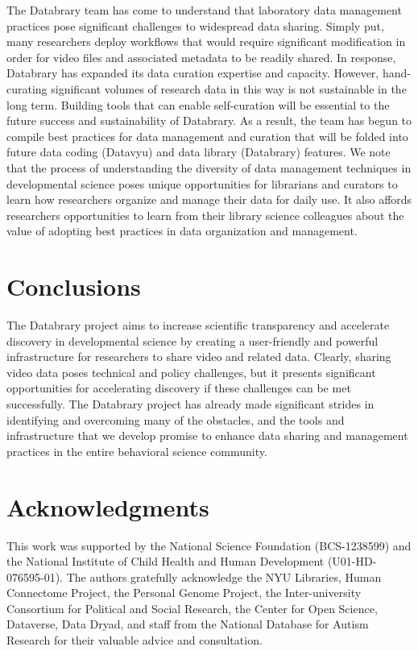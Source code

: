 \documentclass{sig-alternate}
\begin{document}
The Databrary team has come to understand that laboratory data
management practices pose significant challenges to widespread data
sharing. Simply put, many researchers deploy workflows that would
require significant modification in order for video files and associated
metadata to be readily shared. In response, Databrary has expanded its
data curation expertise and capacity. However, hand-curating significant
volumes of research data in this way is not sustainable in the long
term. Building tools that can enable self-curation will be essential to
the future success and sustainability of Databrary. As a result, the
team has begun to compile best practices for data management and
curation that will be folded into future data coding (Datavyu) and data
library (Databrary) features. We note that the process of understanding
the diversity of data management techniques in developmental science
poses unique opportunities for librarians and curators to learn how
researchers organize and manage their data for daily use. It also
affords researchers opportunities to learn from their library science
colleagues about the value of adopting best practices in data
organization and management.

\section{Conclusions}

The Databrary project aims to increase scientific transparency and
accelerate discovery in developmental science by creating a
user-friendly and powerful infrastructure for researchers to share video
and related data. Clearly, sharing video data poses technical and policy
challenges, but it presents significant opportunities for accelerating
discovery if these challenges can be met successfully. The Databrary
project has already made significant strides in identifying and
overcoming many of the obstacles, and the tools and infrastructure that
we develop promise to enhance data sharing and management practices in
the entire behavioral science community.

\section{Acknowledgments}

This work was supported by the National Science Foundation (BCS-1238599)
and the National Institute of Child Health and Human Development
(U01-HD-076595-01). The authors gratefully acknowledge the NYU
Libraries, Human Connectome Project, the Personal Genome Project, the
Inter-university Consortium for Political and Social Research, the
Center for Open Science, Dataverse, Data Dryad, and staff from the
National Database for Autism Research for their valuable advice and
consultation.



\end{document}
